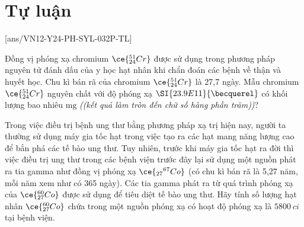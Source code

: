 \section{Tự luận}
[ans/VN12-Y24-PH-SYL-032P-TL]
\setcounter{ex}{0}
\begin{ex}
	Đồng vị phóng xạ chromium $\ce{_{24}^{51}Cr}$ được sử dụng trong phương pháp nguyên tử đánh dấu của y học hạt nhân khi chẩn đoán các bệnh về thận và huyết học. Chu kì bán rã của chromium $\ce{_{24}^{51}Cr}$ là 27,7 ngày. Mẫu chromium $\ce{_{24}^{51}Cr}$ nguyên chất với độ phóng xạ $\SI{23.9E11}{\becquerel}$ có khối lượng bao nhiêu $\si{\milli\gram}$ \textit{((kết quả làm tròn đến chữ số hàng phần trăm))}?
\end{ex}
\begin{ex}
	Trong việc điều trị bệnh ung thư bằng phương pháp xạ trị hiện nay, người ta thường sử dụng máy gia tốc hạt trong việc tạo ra các hạt mang năng lượng cao để bắn phá các tế bào ung thư. Tuy nhiên, trước khi máy gia tốc hạt ra đời thì việc điều trị ung thư trong các bệnh viện trước đây lại sử dụng một nguồn phát ra tia gamma như đồng vị phóng xạ $\ce{_{27}{ }^{67}Co}$ (có chu kì bán rã là 5,27 năm, mỗi năm xem như có 365 ngày). Các tia gamma phát ra từ quá trình phóng xạ của $\ce{_{27}^{60}Co}$ được sử dụng để tiêu diệt tế bào ung thư. Hãy tính số lượng hạt nhân $\ce{_{27}^{60}Co}$ chứa trong một nguồn phóng xạ có hoạt độ phóng xạ là $\SI{5800}{ci}$ tại bệnh viện.
\end{ex}
